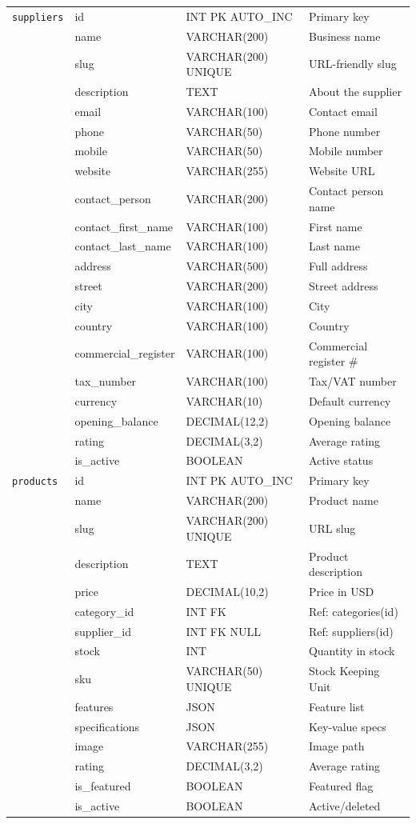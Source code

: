 \documentclass[12pt,a4paper]{report}
\begin{document}
\begin{longtable}{|l|l|l|p{5cm}|}
\texttt{suppliers} & id & INT PK AUTO\_INC & Primary key \\
 & name & VARCHAR(200) & Business name \\
 & slug & VARCHAR(200) UNIQUE & URL-friendly slug \\
 & description & TEXT & About the supplier \\
 & email & VARCHAR(100) & Contact email \\
 & phone & VARCHAR(50) & Phone number \\
 & mobile & VARCHAR(50) & Mobile number \\
 & website & VARCHAR(255) & Website URL \\
 & contact\_person & VARCHAR(200) & Contact person name \\
 & contact\_first\_name & VARCHAR(100) & First name \\
 & contact\_last\_name & VARCHAR(100) & Last name \\
 & address & VARCHAR(500) & Full address \\
 & street & VARCHAR(200) & Street address \\
 & city & VARCHAR(100) & City \\
 & country & VARCHAR(100) & Country \\
 & commercial\_register & VARCHAR(100) & Commercial register \# \\
 & tax\_number & VARCHAR(100) & Tax/VAT number \\
 & currency & VARCHAR(10) & Default currency \\
 & opening\_balance & DECIMAL(12,2) & Opening balance \\
 & rating & DECIMAL(3,2) & Average rating \\
 & is\_active & BOOLEAN & Active status \\
\hline

\texttt{products} & id & INT PK AUTO\_INC & Primary key \\
 & name & VARCHAR(200) & Product name \\
 & slug & VARCHAR(200) UNIQUE & URL slug \\
 & description & TEXT & Product description \\
 & price & DECIMAL(10,2) & Price in USD \\
 & category\_id & INT FK & Ref: categories(id) \\
 & supplier\_id & INT FK NULL & Ref: suppliers(id) \\
 & stock & INT & Quantity in stock \\
 & sku & VARCHAR(50) UNIQUE & Stock Keeping Unit \\
 & features & JSON & Feature list \\
 & specifications & JSON & Key-value specs \\
 & image & VARCHAR(255) & Image path \\
 & rating & DECIMAL(3,2) & Average rating \\
 & is\_featured & BOOLEAN & Featured flag \\
 & is\_active & BOOLEAN & Active/deleted \\
\hline


\end{longtable}
\end{document}
